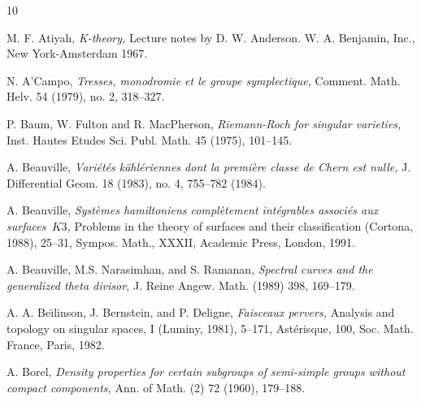 \documentclass[11pt]{amsart}
\theoremstyle{plain}
\theoremstyle{definition}
\theoremstyle{remark}
\begin{document}
\begin{thebibliography}{10}

 M. F. Atiyah, {\em K-theory,} Lecture notes by D. W. Anderson. W. A. Benjamin, Inc., New York-Amsterdam 1967.


 N. A'Campo, {\em Tresses, monodromie et le groupe symplectique,} Comment. Math. Helv. 54 (1979), no. 2, 318--327.


 P. Baum, W. Fulton and R. MacPherson, {\em Riemann-Roch for singular varieties,} Inst. Hautes Etudes Sci. Publ. Math. 45 (1975), 101--145.


 A. Beauville, {\em Vari\'et\'es k\"ahl\'eriennes dont la premi\`ere classe de Chern est nulle,} J. Differential Geom. 18 (1983), no. 4, 755--782 (1984).

 A. Beauville, {\em Syst\`emes hamiltoniens compl\`etement int\'egrables associ\'es aux surfaces~$K3$,} Problems in the theory of surfaces and their classification (Cortona, 1988), 25--31, Sympos. Math., XXXII, Academic Press, London, 1991.

 A. Beauville, M.S. Narasimhan, and S. Ramanan, {\em Spectral curves and the generalized theta divisor,}  J. Reine Angew. Math. (1989) 398, 169--179.


 A. A. Be\u{\i}linson, J. Bernstein, and P. Deligne, {\em Faisceaux pervers,} Analysis and topology on singular spaces, I (Luminy, 1981), 5--171, Ast\'erisque, 100, Soc. Math. France, Paris, 1982.

 A. Borel, {\em Density properties for certain subgroups of semi-simple groups without compact components,} Ann. of Math. (2) 72 (1960), 179--188.







\end{thebibliography}
\end{document}
